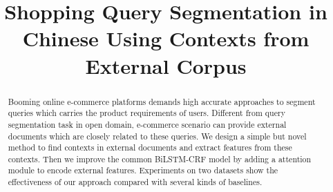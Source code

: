 \documentclass[letterpaper]{article} %
\begin{document}
%
\title{Shopping Query Segmentation in Chinese Using Contexts from External Corpus}
\author{}
\maketitle


\begin{abstract}
	Booming online e-commerce platforms demands high accurate approaches to segment queries which carries the product requirements of users. Different from query segmentation task in open domain, e-commerce scenario can provide external documents which are closely related to these queries. We design a simple but novel method to find contexts in external documents and extract features from these contexts. Then we improve the common BiLSTM-CRF model by adding a attention module to encode external features. Experiments on two datasets show the effectiveness of our approach compared with several kinds of baselines.

\end{abstract}


\begin{CJK}{UTF8}{gbsn}

	

	

	

	

	

	

\end{CJK}




\end{document}
